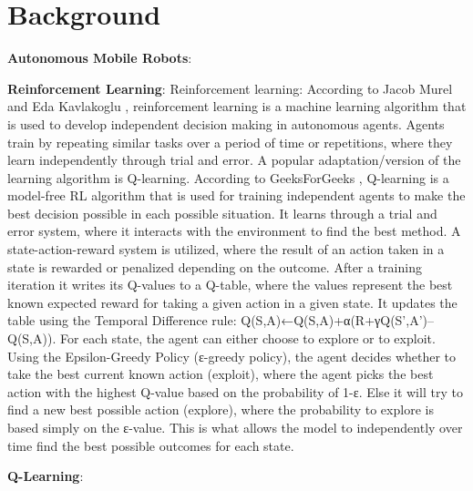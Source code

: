\section{Background}

\textbf{Autonomous Mobile Robots}:


\textbf{Reinforcement Learning}:
Reinforcement learning: According to Jacob Murel and Eda Kavlakoglu \cite{JacobMurel1RL}, reinforcement learning is a machine learning
algorithm that is used to develop independent decision making in autonomous agents.
Agents train by repeating similar tasks over a period of time or repetitions, where they
learn independently through trial and error. A popular adaptation/version of the learning
algorithm is Q-learning. According to GeeksForGeeks \cite{GeeksForGeeks1RL}, Q-learning is a model-free RL
algorithm that is used for training independent agents to make the best decision
possible in each possible situation. It learns through a trial and error system, where it
interacts with the environment to find the best method. A state-action-reward system is
utilized, where the result of an action taken in a state is rewarded or penalized
depending on the outcome. After a training iteration it writes its Q-values to a Q-table,
where the values represent the best known expected reward for taking a given action in
a given state. It updates the table using the Temporal Difference rule:
Q(S,A)←Q(S,A)+α(R+γQ(S’,A’)–Q(S,A)). For each state, the agent can either choose to
explore or to exploit. Using the Epsilon-Greedy Policy (ε-greedy policy), the agent
decides whether to take the best current known action (exploit), where the agent picks
the best action with the highest Q-value based on the probability of 1-ε. Else it will try to
find a new best possible action (explore), where the probability to explore is based
simply on the ε-value. This is what allows the model to independently over time find the
best possible outcomes for each state.


\textbf{Q-Learning}: